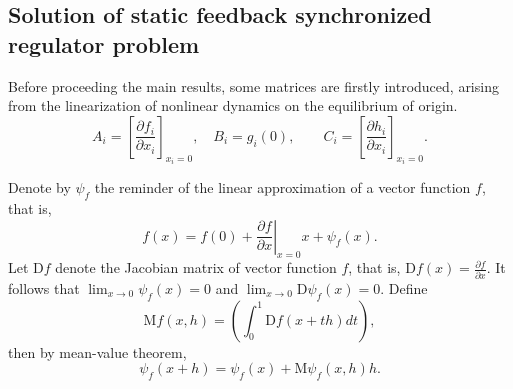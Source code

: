 \documentclass[onecolumn,a4paper,12pt]{article}
\numberwithin{equation}{section}
\begin{document}
\subsection{Solution of static feedback synchronized regulator problem}
Before proceeding the main results, some matrices are firstly introduced, arising from the linearization of nonlinear dynamics on the equilibrium of origin.
\begin{equation}
  A_i = \left[ \frac{\partial f_i}{\partial x_i}\right]_{x_i=0},  \quad B_i = g_i(0), \quad \quad C_i= \left[ \frac{\partial h_i }{\partial x_i}\right]_{x_i=0}.
  \end{equation}

Denote by $\psi_{f}$ the reminder of the linear approximation of a vector function $f$, that is,
\begin{equation}
  f(x)=f(0)+\left.\frac{\partial f}{\partial x}\right|_{x=0} x + \psi_f(x).
\end{equation}
Let $\mathrm{D}f$ denote the Jacobian matrix of vector function $f$, that is, $\mathrm{D}f(x) = \frac{\partial f}{\partial x}$. It follows that $\lim_{x\rightarrow 0}\psi_f(x)=0$ and $\lim_{x\rightarrow 0}\mathrm{D}\psi_f(x)=0$.
Define
\begin{equation} \label{III07}
 \mathrm{ M}f(x,h)=\left(\int^1_0 \mathrm{D}f(x+th)dt\right),
\end{equation}
then by mean-value theorem,
\begin{equation} \label{III08}
\psi_f(x+h)=\psi_f(x)+\mathrm{M}\psi_f(x,h)h.
\end{equation}
\end{document}
